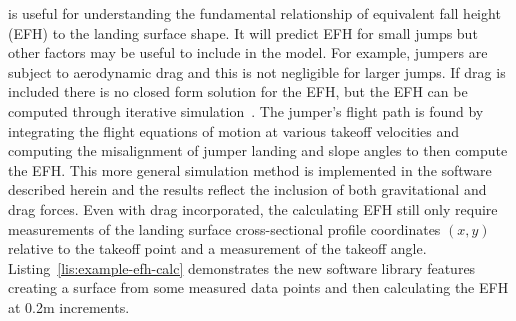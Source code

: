 \documentclass[]{article}
\begin{document}
is useful for understanding the fundamental relationship of equivalent fall
height (EFH) to the landing surface shape. It will predict EFH for small jumps
but other factors may be useful to include in the model. For example, jumpers
are subject to aerodynamic drag and this is not negligible for larger jumps. If
drag is included there is no closed form solution for the EFH, but the EFH can
be computed through iterative simulation~\cite{Levy2015}. The jumper's flight
path is found by integrating the flight equations of motion at various takeoff
velocities and computing the misalignment of jumper landing and slope angles to
then compute the EFH. This more general simulation method is implemented in the
software described herein and the results reflect the inclusion of both
gravitational and drag forces. Even with drag incorporated, the calculating EFH
still only require measurements of the landing surface cross-sectional profile
coordinates $(x,y)$ relative to the takeoff point and a measurement of the
takeoff angle.  Listing~\ref{lis:example-efh-calc} demonstrates the new
software library features creating a surface from some measured data points and
then calculating the EFH at 0.2\si{\meter} increments.
%
\end{document}
